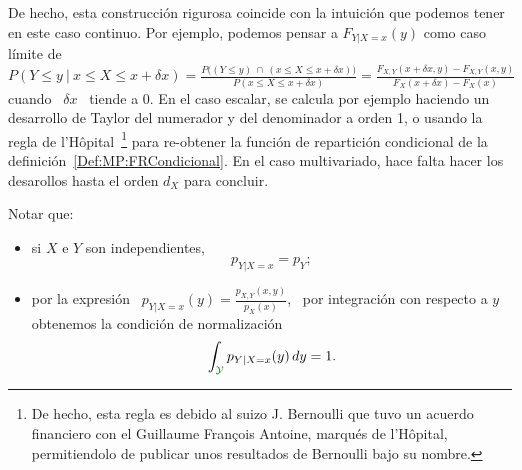 De hecho, esta  construcci\'on rigurosa coincide con la  intuici\'on que podemos
tener en este  caso continuo. Por ejemplo, podemos  pensar a $F_{Y|X=x}(y)$ como
caso l\'imite de $\displaystyle P\left( Y \le y \: \Big| \: x \le X \le x+\delta
  x \right) = \frac{P\big( \left( Y \le y  \right) \: \cap \: \left( x \le X \le
    x+\delta  x  \right)  \big)}{P\left( x  \le  X  \le  x+\delta x  \right)}  =
\frac{F_{X,Y}(x+\delta  x ,  y) -  F_{X,Y}(x  , y)}{F_X(x+\delta  x) -  F_X(x)}$
cuando \ $\delta  x$ \ tiende a 0.   En el caso escalar, se  calcula por ejemplo
haciendo un  desarrollo de Taylor del numerador  y del denominador a  orden 1, o
usando la regla de l'H\^opital~\footnote{De hecho, esta regla es debido al suizo
  J.  Bernoulli  que tuvo  un acuerdo financiero  con el  Guillaume Fran\c{c}ois
  Antoine, marqu\'es  de l'H\^opital, permitiendolo de  publicar unos resultados
  de Bernoulli bajo  su nombre.}  para re-obtener la  funci\'on de repartici\'on
condicional   de  la   definici\'on~\ref{Def:MP:FRCondicional}.    En  el   caso
multivariado,  hace  falta  hacer  los  desarollos hasta  el  orden  $d_X$  para
concluir.

Notar  que:
%
\begin{itemize}
\item si $X$ e $Y$ son independientes,
  \[
  p_{Y|X=x} = p_Y;
  \]
%
\item por  la expresi\'on \ $p_{Y|X=x}(y) =  \frac{p_{X,Y}(x,y)}{p_X(x)}$, \ por
  integraci\'on con respecto a $y$ obtenemos la condici\'on de normalizaci\'on
  \[
  \int_{\modif{\Y}} p_{Y|X=x}(y) \, dy = 1.
  \]
%
%
\end{itemize}

